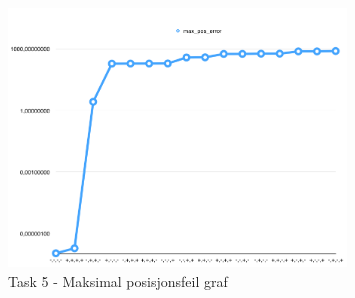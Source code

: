 \begin{figure}
		\centering
		\includegraphics[width=0.8\textwidth]{sections/Exercise5/max_pos_error_graph.png}
		    \caption{Task 5 - Maksimal posisjonsfeil graf}
		    \label{fig:task5max_pos_error_graph}
	\end{figure}

% 